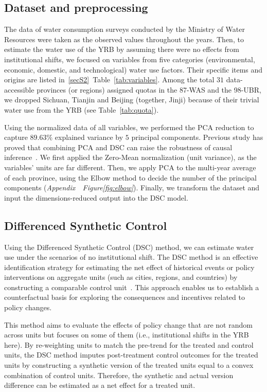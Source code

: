\documentclass[preprint, 12pt]{elsarticle}
\begin{document}
\subsection{Dataset and preprocessing}\label{sec:dataset}
The data of water consumption surveys conducted by the Ministry of Water Resources were taken as the observed values throughout the years.
Then, to estimate the water use of the YRB by assuming there were no effects from institutional shifts, we focused on variables from five categories (environmental, economic, domestic, and technological) water use factors. Their specific items and origins are listed in~\ref{secS2}~Table~\ref{tab:variables}.
Among the total $31$ data-accessible provinces (or regions) assigned quotas in the 87-WAS and the 98-UBR, we dropped Sichuan, Tianjin and Beijing (together, Jinji) because of their trivial water use from the YRB (see Table~\ref{tab:quota}).


Using the normalized data of all variables, we performed the PCA reduction to capture $89.63\%$ explained variance by $5$ principal components.
Previous study has proved that combining PCA and DSC can raise the robustness of causal inference~\cite{bayani2021}.
We first applied the Zero-Mean normalization (unit variance), as the variables' units are far different. Then, we apply PCA to the multi-year average of each province, using the Elbow method to decide the number of the principal components (\textit{Appendix~~Figure\ref{fig:elbow}}).
Finally, we transform the dataset and input the dimensions-reduced output into the DSC model.

\subsection{Differenced Synthetic Control}\label{sec:DSC}
Using the Differenced Synthetic Control (DSC) method, we can estimate water use under the scenarios of no institutional shift.
The DSC method is an effective identification strategy for estimating the net effect of historical events or policy interventions on aggregate units (such as cities, regions, and countries) by constructing a comparable control unit~\cite{abadie2010, abadie2015, hill2021}.
This approach enables us to establish a counterfactual basis for exploring the consequences and incentives related to policy changes.

This method aims to evaluate the effects of policy change that are not random across units but focuses on some of them (i.e., institutional shifts in the YRB here).
By re-weighting units to match the pre-trend for the treated and control units, the DSC method imputes post-treatment control outcomes for the treated units by constructing a synthetic version of the treated units equal to a convex combination of control units.
Therefore, the synthetic and actual version difference can be estimated as a net effect for a treated unit.
\end{document}
